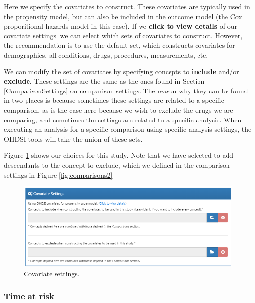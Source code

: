 \documentclass[11pt]{book}
\theoremstyle{definition}
\theoremstyle{definition}
\theoremstyle{definition}
\theoremstyle{remark}
\begin{document}
Here we specify the covariates to construct. These covariates are typically used in the propensity model, but can also be included in the outcome model (the Cox proporitional hazards model in this case). If we \textbf{click to view details} of our covariate settings, we can select which sets of covariates to construct. However, the recommendation is to use the default set, which constructs covariates for demographics, all conditions, drugs, procedures, measurements, etc.

We can modify the set of covariates by specifying concepts to \textbf{include} and/or \textbf{exclude}. These settings are the same as the ones found in Section \ref{ComparisonSettings} on comparison settings. The reason why they can be found in two places is because sometimes these settings are related to a specific comparison, as is the case here because we wish to exclude the drugs we are comparing, and sometimes the settings are related to a specific analysis. When executing an analysis for a specific comparison using specific analysis settings, the OHDSI tools will take the union of these sets.

Figure \ref{fig:covariateSettings} shows our choices for this study. Note that we have selected to add descendants to the concept to exclude, which we defined in the comparison settings in Figure \ref{fig:comparisons2}.

\begin{figure}

{\centering \includegraphics[width=1\linewidth]{images/PopulationLevelEstimation/covariateSettings} 

}

\caption{Covariate settings.}\label{fig:covariateSettings}
\end{figure}

\hypertarget{time-at-risk-2}{%
\subsubsection*{Time at risk}\label{time-at-risk-2}}
\end{document}
